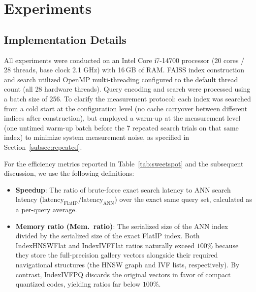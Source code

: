 \documentclass[conference]{IEEEtran}
\begin{document}
\section{Experiments}
\label{sec:results}

\subsection{Implementation Details}
\label{subsec:implementation}

All experiments were conducted on an Intel Core i7-14700 processor (20 cores / 28 threads, base clock 2.1 GHz) with 16\,GB of RAM. FAISS index construction and search utilized OpenMP multi-threading configured to the default thread count (all 28 hardware threads). Query encoding and search were processed using a batch size of 256. To clarify the measurement protocol: each index was searched from a cold start at the configuration level (no cache carryover between different indices after construction), but employed a warm-up at the measurement level (one untimed warm-up batch before the 7 repeated search trials on that same index) to minimize system measurement noise, as specified in Section~\ref{subsec:repeated}.

For the efficiency metrics reported in Table~\ref{tab:sweetspot} and the subsequent discussion, we use the following definitions:
\begin{itemize}
    \item \textbf{Speedup}: The ratio of brute-force exact search latency to ANN search latency ($\text{latency}_{\text{FlatIP}} / \text{latency}_{\text{ANN}}$) over the exact same query set, calculated as a per-query average.
    \item \textbf{Memory ratio (Mem.\ ratio)}: The serialized size of the ANN index divided by the serialized size of the exact FlatIP index. Both IndexHNSWFlat and IndexIVFFlat ratios naturally exceed $100\%$ because they store the full-precision gallery vectors alongside their required navigational structures (the HNSW graph and IVF lists, respectively). By contrast, IndexIVFPQ discards the original vectors in favor of compact quantized codes, yielding ratios far below $100\%$.
\end{itemize}
\end{document}
